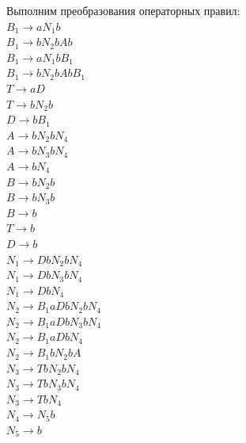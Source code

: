 \documentclass[a4paper,14pt]{extarticle}
\begin{document}
\begin{enumerate}[1.]
Выполним преобразования операторных правил:\\
$B_1 \rightarrow aN_1b$\\
$B_1 \rightarrow bN_2bAb$\\
$B_1 \rightarrow aN_1bB_1$\\
$B_1 \rightarrow bN_2bAbB_1$\\
$T \rightarrow aD$\\ 
$T \rightarrow bN_2b$\\
$D \rightarrow bB_1$\\
$A \rightarrow bN_2bN_4$\\
$A \rightarrow bN_3bN_4$\\
$A \rightarrow bN_4$\\
$B \rightarrow bN_2b$\\ 
$B \rightarrow bN_3b$\\ 
$B \rightarrow b$\\
$T \rightarrow b$\\
$D \rightarrow b$\\
$N_1 \rightarrow DbN_2bN_4$\\
$N_1 \rightarrow DbN_3bN_4$\\
$N_1 \rightarrow DbN_4$\\
$N_2 \rightarrow B_1aDbN_2bN_4$\\
$N_2 \rightarrow B_1aDbN_3bN_4$\\
$N_2 \rightarrow B_1aDbN_4$\\
$N_2 \rightarrow B_1bN_2bA$\\
$N_3 \rightarrow TbN_2bN_4$\\
$N_3 \rightarrow TbN_3bN_4$\\
$N_3 \rightarrow TbN_4$\\
$N_4 \rightarrow N_5b$\\
$N_5 \rightarrow b$\\


\end{enumerate}
\end{document}
